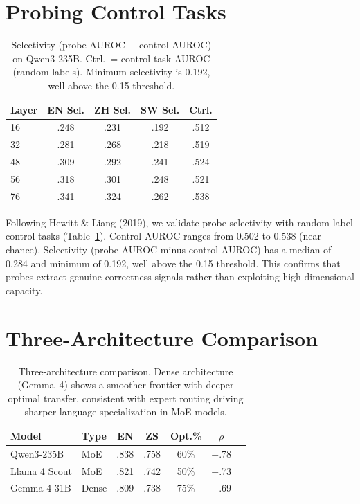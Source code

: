 \documentclass[11pt,a4paper]{article}
\begin{document}
\section{Probing Control Tasks}
\label{app:control}

\begin{table}[h]
\centering
\small
\begin{tabular}{@{}lcccc@{}}
\toprule
\textbf{Layer} & \textbf{EN Sel.} & \textbf{ZH Sel.} & \textbf{SW Sel.} & \textbf{Ctrl.} \\
\midrule
16 & .248 & .231 & .192 & .512 \\
32 & .281 & .268 & .218 & .519 \\
48 & .309 & .292 & .241 & .524 \\
56 & .318 & .301 & .248 & .521 \\
76 & .341 & .324 & .262 & .538 \\
\bottomrule
\end{tabular}
\caption{Selectivity (probe AUROC $-$ control AUROC) on Qwen3-235B. Ctrl.\ = control task AUROC (random labels). Minimum selectivity is 0.192, well above the 0.15 threshold.}
\label{tab:control}
\end{table}

Following Hewitt \& Liang (2019), we validate probe selectivity with random-label control tasks (Table~\ref{tab:control}).
Control AUROC ranges from 0.502 to 0.538 (near chance).
Selectivity (probe AUROC minus control AUROC) has a median of 0.284 and minimum of 0.192, well above the 0.15 threshold.
This confirms that probes extract genuine correctness signals rather than exploiting high-dimensional capacity.

\section{Three-Architecture Comparison}
\label{app:gemma}

\begin{table}[h]
\centering
\small
\begin{tabular}{@{}llccccc@{}}
\toprule
\textbf{Model} & \textbf{Type} & \textbf{EN} & \textbf{ZS} & \textbf{Opt.\%} & $\rho$ \\
\midrule
Qwen3-235B & MoE & .838 & .758 & 60\% & $-$.78 \\
Llama 4 Scout & MoE & .821 & .742 & 50\% & $-$.73 \\
Gemma 4 31B & Dense & .809 & .738 & 75\% & $-$.69 \\
\bottomrule
\end{tabular}
\caption{Three-architecture comparison. Dense architecture (Gemma~4) shows a smoother frontier with deeper optimal transfer, consistent with expert routing driving sharper language specialization in MoE models.}
\label{tab:arch}
\end{table}
\end{document}
